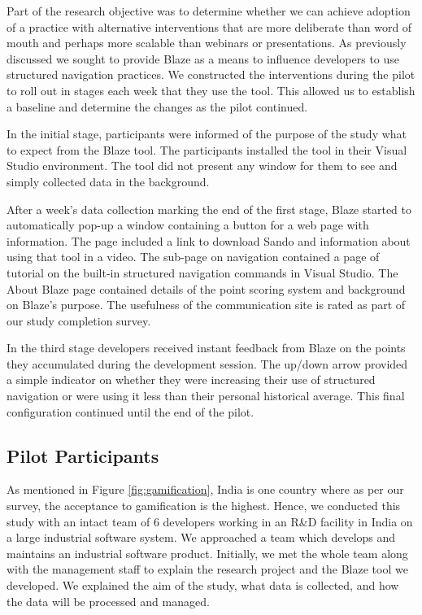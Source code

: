 \documentclass{sig-alternate}
\begin{document}
Part of the research objective was to determine whether we can achieve adoption of a practice with alternative interventions that are more deliberate than word of mouth and perhaps more scalable than webinars or presentations.  As previously discussed we sought to provide Blaze as a means to influence developers to use structured navigation practices.  We constructed the interventions during the pilot to roll out in stages each week that they use the tool.  This allowed us to establish a baseline and determine the changes as the pilot continued.

In the initial stage, participants were informed of the purpose of the study what to expect from the Blaze tool.  The participants installed the tool in their Visual Studio environment.  The tool did not present any window for them to see and simply collected data in the background.   

After a week's data collection marking the end of the first stage, Blaze started to automatically pop-up a window containing a button for a web page with information.  The page included a link to download Sando  and information about using that tool in a video.  The sub-page on navigation contained a page of tutorial on the built-in structured navigation commands in Visual Studio.  The About Blaze page contained details of the point scoring system and background on Blaze's purpose.  The usefulness of the communication site is rated as part of our study completion survey.

In the third stage developers received instant feedback from Blaze on the points they accumulated during the development session.  The up/down arrow provided a simple indicator on whether they were increasing their use of structured navigation or were using it less than their personal historical average.  This final configuration continued until the end of the pilot.  

\subsection{Pilot Participants}

As mentioned in Figure \ref{fig:gamification}, India is one country where as per our survey, the acceptance to gamification is the highest. Hence, we conducted this study with an intact team of 6 developers working in an R\&D facility in India on a large industrial software system. We approached a team which develops and maintains an industrial software product. Initially, we met the whole team along with the management staff to explain the research project and the Blaze tool we developed. We  explained the aim of the study, what data is collected, and how the data will be processed and managed. 
\end{document}
